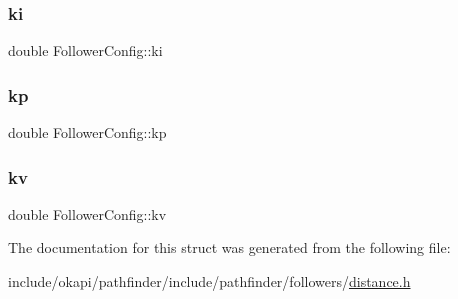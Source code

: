 \mbox{\label{structFollowerConfig_ad40fa35c7cc042d9d0e05afbbfad2acb}} 
\subsubsection{\texorpdfstring{ki}{ki}}
{\footnotesize\ttfamily double Follower\+Config\+::ki}

\mbox{\label{structFollowerConfig_afe874822d268765aadee0cf1f3ae3ff6}} 
\subsubsection{\texorpdfstring{kp}{kp}}
{\footnotesize\ttfamily double Follower\+Config\+::kp}

\mbox{\label{structFollowerConfig_ae54028c47cf1d3ccad3b8915d0755055}} 
\subsubsection{\texorpdfstring{kv}{kv}}
{\footnotesize\ttfamily double Follower\+Config\+::kv}



The documentation for this struct was generated from the following file\+:\begin{DoxyCompactItemize}
\item 
include/okapi/pathfinder/include/pathfinder/followers/\mbox{\hyperlink{distance_8h}{distance.\+h}}\end{DoxyCompactItemize}
